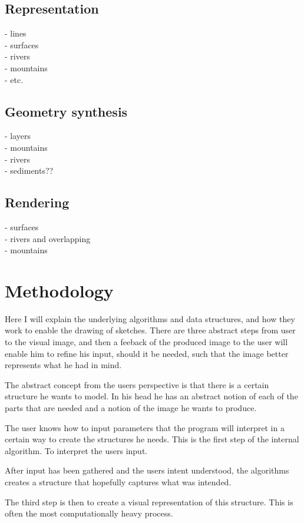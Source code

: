 \documentclass[a4paper,10pt]{article}
\begin{document}
\subsection{Representation}
- lines\\
- surfaces\\
- rivers\\
- mountains\\
- etc.
\subsection{Geometry synthesis}
- layers\\
- mountains\\
- rivers\\
- sediments??
\subsection{Rendering}
- surfaces\\
- rivers and overlapping\\
- mountains

\section{Methodology}

Here I will explain the underlying algorithms and data structures, and how they work to enable the drawing of sketches. There are three abstract steps from user to the visual image, and then a feeback of the produced image to the user will enable him to refine his input, should it be needed, such that the image better represents what he had in mind.

The abstract concept from the users perspective is that there is a certain structure he wants to model. In his head he has an abstract notion of each of the parts that are needed and a notion of the image he wants to produce.

The user knows how to input parameters that the program will interpret in a certain way to create the structures he needs. This is the first step of the internal algorithm. To interpret the users input.

After input has been gathered and the users intent understood, the algorithms creates a structure that hopefully captures what was intended.

The third step is then to create a visual representation of this structure. This is often the most computationally heavy process.
\end{document}
